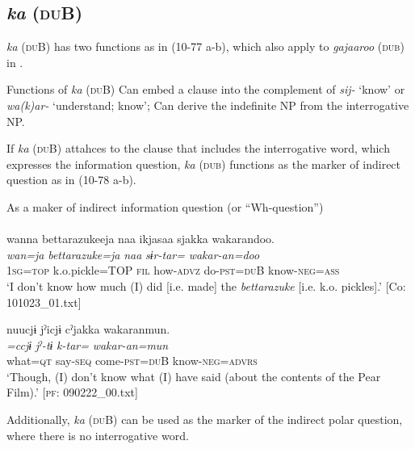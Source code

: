\subsection{\textit{ka} (\textsc{du}B)}\label{sec:10.4.2}

\textit{ka} (\textsc{du}B) has two functions as in (10-77 a-b), which also apply to \textit{gajaaroo} (\textsc{dub}) in .

\ea\label{ex:10.77} Functions of \textit{ka} (\textsc{du}B)
 \ea Can embed a clause into the complement of \textit{sij-} ‘know’ or \textit{wa(k)ar-} ‘understand; know’;
 \ex Can derive the indefinite NP from the interrogative NP.
 \z
\z

If \textit{ka} (\textsc{du}B) attahces to the clause that includes the interrogative word, which expresses the information question, \textit{ka} (\textsc{dub}) functions as the marker of indirect question as in (10-78 a-b).

\ea\label{ex:10.78}   As a maker of indirect information question (or “Wh-question”)\\
  \ea\relax  [= (5-38 a)]\\
      \glll    wanna  {\textbar}bettarazukee{\textbar}ja  naa  ikjasaa  sjakka  wakarandoo.\\
      \textit{wan=ja}  \textit{bettarazuke=ja}  \textit{naa}  \textit{}  \textit{sɨr-tar=}  \textit{wakar-an=doo}\\
      1\textsc{sg}=\textsc{top}  k.o.pickle=TOP  \textsc{fil}  how-\textsc{advz}  do-\textsc{pst}=\textsc{du}B  know-\textsc{neg}=\textsc{ass}\\
      \glt       ‘I don’t know how much (I) did [i.e. made] the \textit{bettarazuke} [i.e. k.o. pickles].’ [Co: 101023\_01.txt]

  \ex %
      \glll    nuucjɨ  jˀicjɨ  cˀjakka  wakaranmun.\\
      \textit{=ccjɨ}  \textit{jˀ-tɨ}  \textit{k-tar=}  \textit{wakar-an=mun}\\
      what=\textsc{qt}  say-\textsc{seq}  come-\textsc{pst}=\textsc{du}B  know-\textsc{neg}=\textsc{advrs}\\
      \glt       ‘Though, (I) don’t know what (I) have said (about the contents of the Pear Film).’ [\textsc{pf}: 090222\_00.txt]
    \z
\z

Additionally, \textit{ka} (\textsc{du}B) can be used as the marker of the indirect polar question, where there is no interrogative word.

